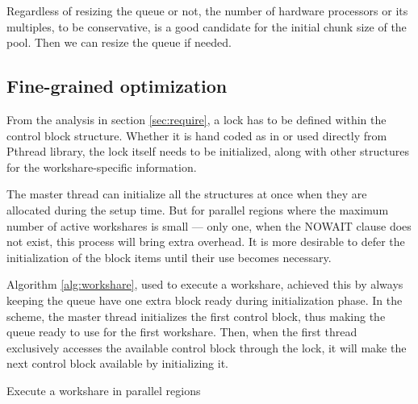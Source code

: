 Regardless of resizing the queue or not, the number of hardware
processors or its multiples, to be conservative, is a good candidate
for the initial chunk size of the pool. Then we can resize the queue
if needed.

\subsection{Fine-grained optimization}
\label{sec:optimize}

From the analysis in section \ref{sec:require}, a lock has to be defined
within the control block structure. Whether it is hand coded as in
\cite{Mel91} or used directly from Pthread library\cite{But97}, the
lock itself needs to be initialized, along with other structures for
the workshare-specific information.

The master thread can initialize all the structures at once when they
are allocated during the setup time. But for parallel regions where
the maximum number of active workshares is small --- only one, when
the NOWAIT clause does not exist, this process will bring extra overhead.
It is more desirable to defer the initialization of the block items
until their use becomes necessary.

Algorithm \ref{alg:workshare}, used to execute a workshare, achieved
this by always keeping the queue have one extra block ready during
initialization phase. In the scheme, the master thread initializes the
first control block, thus making the queue ready to use for the first
workshare. Then, when the first thread exclusively accesses the
available control block through the lock, it will make the next
control block available by initializing it.


\begin{algorithm}[h]
  \SetLine %
{\small
  \BlankLine

}
  \caption{Execute a workshare in parallel regions}
  \label{alg:workshare}
\end{algorithm}

